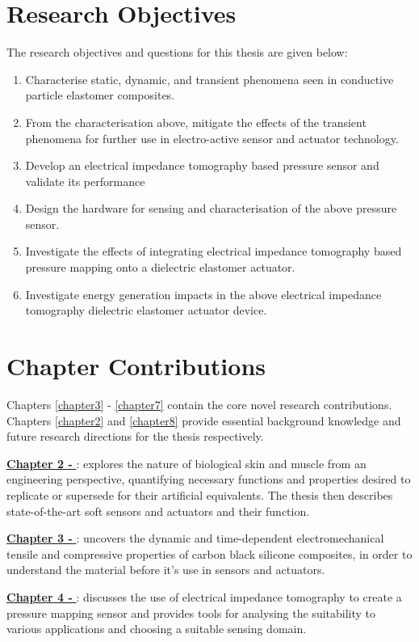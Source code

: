 \section{Research Objectives}
The research objectives and questions for this thesis are given below:
\begin{enumerate}
	\item Characterise static, dynamic, and transient phenomena seen in conductive particle elastomer composites.
	\item From the characterisation above, mitigate the effects of the transient phenomena for further use in electro-active sensor and actuator technology.
	\item Develop an electrical impedance tomography based pressure sensor and validate its performance
	\item Design the hardware for sensing and characterisation of the above pressure sensor.
	\item Investigate the effects of integrating electrical impedance tomography based pressure mapping onto a dielectric elastomer actuator.
	\item Investigate energy generation impacts in the above electrical impedance tomography dielectric elastomer actuator device.
\end{enumerate}



\section{Chapter Contributions}
Chapters \ref{chapter3} - \ref{chapter7} contain the core novel research contributions. Chapters \ref{chapter2} and \ref{chapter8} provide essential background knowledge and future research directions for the thesis respectively.

\hyperref[chapter2]{\textbf{Chapter 2 - \chapiiname}}: explores the nature of biological skin and muscle from an engineering perspective, quantifying necessary functions and properties desired to replicate or supersede for their artificial equivalents. The thesis then describes state-of-the-art soft sensors and actuators and their function.

\hyperref[chapter3]{\textbf{Chapter 3 - \chapiiiname}}: uncovers the dynamic and time-dependent electromechanical tensile and compressive properties of carbon black silicone composites, in order to understand the material before it's use in sensors and actuators.

\hyperref[chapter4]{\textbf{Chapter 4 - \chapivname}}: discusses the use of electrical impedance tomography to create a pressure mapping sensor and provides tools for analysing the suitability to various applications and choosing a suitable sensing domain.

